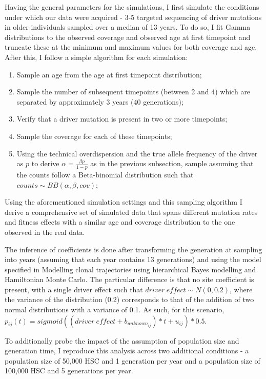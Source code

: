 Having the general parameters for the simulations, I first simulate the conditions under which our data were acquired - 3-5 targeted sequencing of driver mutations in older individuals sampled over a median of 13 years. To do so, I fit Gamma distributions to the observed coverage and observed age at first timepoint and truncate these at the minimum and maximum values for both coverage and age. After this, I follow a simple algorithm for each simulation:

\begin{enumerate}
    \item Sample an age from the age at first timepoint distribution;
    \item Sample the number of subsequent timepoints (between 2 and 4) which are separated by approximately 3 years (40 generations);
    \item Verify that a driver mutation is present in two or more timepoints;
    \item Sample the coverage for each of these timepoints;
    \item Using the technical overdispersion and the true allele frequency of the driver as $p$ to derive $\alpha = \frac{\beta p}{1-p}$ as in the previous subsection, sample assuming that the counts follow a Beta-binomial distribution such that $counts \sim BB(\alpha,\beta,cov)$;
\end{enumerate}

Using the aforementioned simulation settings and this sampling algorithm I derive a comprehensive set of simulated data that spans different mutation rates and fitness effects with a similar age and coverage distribution to the one observed in the real data.

The inference of coefficients is done after transforming the generation at sampling into years (assuming that each year contains 13 generations) and using the model specified in Modelling clonal trajectories using hierarchical Bayes modelling and Hamiltonian Monte Carlo. The particular difference is that no site coefficient is present, with a single driver effect such that $driver\ effect \sim N(0,0.2)$, where the variance of the distribution (0.2) corresponds to that of the addition of two normal distributions with a variance of 0.1. As such, for this scenario, $p_{ij}(t)=sigmoid((driver\ effect+b_{unknown_{ij}})*t + u_{ij})*0.5$.

To additionally probe the impact of the assumption of population size and generation time, I reproduce this analysis across two additional conditions - a population size of 50,000 HSC and 1 generation per year and a population size of 100,000 HSC and 5 generations per year.

